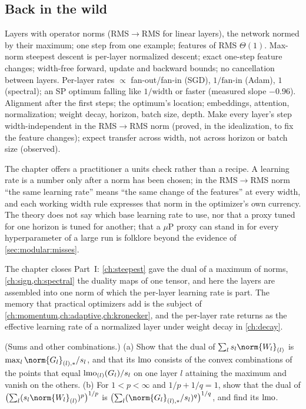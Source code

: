 \begin{refsection}
\section{Back in the wild}\label{sec:modular:back}

{Layers with operator norms (RMS$\to$RMS for linear layers), the network normed by their maximum; one step from one example; features of RMS $\Theta(1)$.}
{Max-norm steepest descent is per-layer normalized descent; exact one-step feature changes; width-free forward, update and backward bounds; no cancellation between layers.}
{Per-layer rates $\propto$ fan-out/fan-in (SGD), $1/\text{fan-in}$ (Adam), $1$ (spectral); an SP optimum falling like $1/\text{width}$ or faster (measured slope $-0.96$).}
{Alignment after the first steps; the optimum's location; embeddings, attention, normalization; weight decay, horizon, batch size, depth.}
{Make every layer's step width-independent in the RMS$\to$RMS norm (proved, in the idealization, to fix the feature changes); expect transfer across width, not across horizon or batch size (observed).}

The chapter offers a practitioner a units check rather than a recipe. A learning rate is a number only after a norm has been chosen; in the RMS$\to$RMS norm ``the same learning rate'' means ``the same change of the features'' at every width, and each working width rule expresses that norm in the optimizer's own currency. The theory does not say which base learning rate to use, nor that a proxy tuned for one horizon is tuned for another; that a $\mu$P proxy can stand in for every hyperparameter of a large run is folklore beyond the evidence of \cref{sec:modular:misses}.

The chapter closes Part~I: \cref{ch:steepest} gave the dual of a maximum of norms, \cref{ch:sign,ch:spectral} the duality maps of one tensor, and here the layers are assembled into one norm of which the per-layer learning rate is part. The memory that practical optimizers add is the subject of \cref{ch:momentum,ch:adaptive,ch:kronecker}, and the per-layer rate returns as the effective learning rate of a normalized layer under weight decay in \cref{ch:decay}.

\begin{exercises}
\item \consolidation (Sums and other combinations.) (a) Show that the dual of $\sum_ls_l\norm{W_l}_{(l)}$ is $\max_l\norm{G_l}_{(l),*}/s_l$, and that its $\operatorname{lmo}$ consists of the convex combinations of the points that equal $\operatorname{lmo}_{(l)}(G_l)/s_l$ on one layer $l$ attaining the maximum and vanish on the others. (b) For $1<p<\infty$ and $1/p+1/q=1$, show that the dual of $\bigl(\sum_l(s_l\norm{W_l}_{(l)})^p\bigr)^{1/p}$ is $\bigl(\sum_l(\norm{G_l}_{(l),*}/s_l)^q\bigr)^{1/q}$, and find its $\operatorname{lmo}$.\label{ex:modular:sum}


\end{exercises}
\end{refsection}
